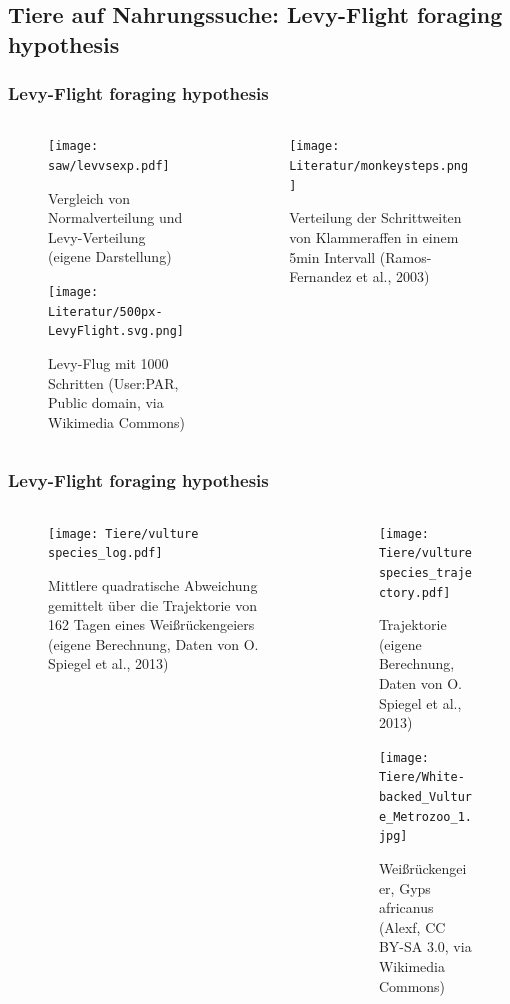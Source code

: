 \documentclass{beamer}
\begin{document}
	\subsection{Tiere auf Nahrungssuche: Levy-Flight foraging hypothesis}
	\begin{frame}
		\frametitle{Levy-Flight foraging hypothesis}
		\begin{columns}[c]
			\begin{column}{.5\textwidth}
				\begin{figure}
					\centering
					\texttt{[image: saw/levvsexp.pdf]}
					\caption{Vergleich von Normalverteilung und Levy-Verteilung (eigene Darstellung)}
				\end{figure}
				\begin{figure}
					\centering
					\texttt{[image: Literatur/500px-LevyFlight.svg.png]}
					\caption{Levy-Flug mit 1000 Schritten (User:PAR, Public domain, via Wikimedia Commons)}
				\end{figure}
			\end{column}
			\begin{column}{.5\textwidth}
			\begin{figure}
				\centering
				\texttt{[image: Literatur/monkeysteps.png]}
				\caption{Verteilung der Schrittweiten von Klammeraffen in einem 5min Intervall (Ramos-Fernandez et al., 2003)}
			\end{figure}
		\end{column}
		\end{columns}
	\end{frame}
	\begin{frame}
		\frametitle{Levy-Flight foraging hypothesis}
		\begin{columns}
			\begin{column}{0.6\textwidth}
				\begin{figure}
					\centering
					\texttt{[image: Tiere/vulture species\_log.pdf]}
					\caption{Mittlere quadratische Abweichung gemittelt über die Trajektorie von 162 Tagen eines Weißrückengeiers (eigene Berechnung, Daten von O. Spiegel et al., 2013)}
				\end{figure}
			\end{column}
			\begin{column}{0.4\textwidth}
				\begin{figure}
					\texttt{[image: Tiere/vulture species\_trajectory.pdf]}
					\caption{Trajektorie (eigene Berechnung, Daten von O. Spiegel et al., 2013)}
				\end{figure}
				\begin{figure}
					\texttt{[image: Tiere/White-backed\_Vulture\_Metrozoo\_1.jpg]}
					\caption{Weißrückengeier, Gyps africanus (Alexf, CC BY-SA 3.0, via Wikimedia Commons)}
				\end{figure}
			\end{column}
		\end{columns}
	\end{frame}
\end{document}
